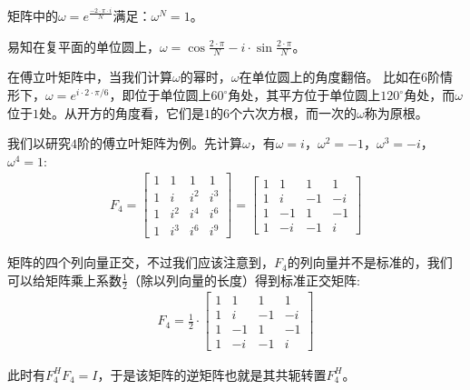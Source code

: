 矩阵中的$\omega=e^{\frac{-2\cdot \pi\cdot i}{N}}$满足：$\omega ^N=1$。

易知在复平面的单位圆上，$\omega=\cos\frac{2\cdot \pi}{N}-i\cdot \sin\frac{2\cdot \pi}{N}$。

在傅立叶矩阵中，当我们计算$\omega$的幂时，$\omega$在单位圆上的角度翻倍。
比如在$6$阶情形下，$\omega=e^{i\cdot 2\cdot \pi/6}$，即位于单位圆上$60^\circ$角处，其平方位于单位圆上$120^\circ$角处，而$\omega$位于$1$处。从开方的角度看，它们是$1$的$6$个六次方根，而一次的$\omega$称为原根。

我们以研究$4$阶的傅立叶矩阵为例。先计算$\omega$，有$\omega=i$，$\omega^2=-1$，$\omega^3=-i$，$\omega^4=1$:
\begin{align*}
	F_4=\begin{bmatrix}1&1&1&1\\1&i&i^2&i^3\\1&i^2&i^4&i^6\\1&i^3&i^6&i^9\end{bmatrix}=\begin{bmatrix}1&1&1&1\\1&i&-1&-i\\1&-1&1&-1\\1&-i&-1&i\end{bmatrix}
\end{align*}

矩阵的四个列向量正交，不过我们应该注意到，$F_4$的列向量并不是标准的，我们可以给矩阵乘上系数$\frac{1}{2}$（除以列向量的长度）得到标准正交矩阵:
\begin{align*}
	F_4=\frac{1}{2}\cdot \begin{bmatrix}1&1&1&1\\1&i&-1&-i\\1&-1&1&-1\\1&-i&-1&i\end{bmatrix}
\end{align*}

此时有$F_4^HF_4=I$，于是该矩阵的逆矩阵也就是其共轭转置$F_4^H$。

